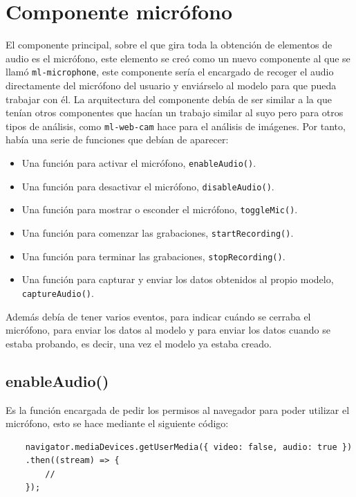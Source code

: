 \documentclass[a4paper, 12pt]{book}
\begin{document}
\section{Componente micrófono}
\label{sec:mic}

El componente principal, sobre el que gira toda la obtención de elementos de audio es el micrófono, este elemento se creó como un nuevo componente al que se llamó \texttt{ml-microphone}, este componente sería el encargado de recoger el audio directamente del micrófono del usuario y enviárselo al modelo para que pueda trabajar con él. La arquitectura del componente debía de ser similar a la que tenían otros componentes que hacían un trabajo similar al suyo pero para otros tipos de análisis, como \texttt{ml-web-cam} hace para el análisis de imágenes. Por tanto, había una serie de funciones que debían de aparecer:
\begin{itemize}
	\item Una función para activar el micrófono, \texttt{enableAudio()}.
	\item Una función para desactivar el micrófono, \texttt{disableAudio()}.
	\item Una función para mostrar o esconder el micrófono, \texttt{toggleMic()}.
	\item Una función para comenzar las grabaciones, \texttt{startRecording()}.
	\item Una función para terminar las grabaciones, \texttt{stopRecording()}.
	\item Una función para capturar y enviar los datos obtenidos al propio modelo, \texttt{captureAudio()}.
\end{itemize}

Además debía de tener varios eventos, para indicar cuándo se cerraba el micrófono, para enviar los datos al modelo y para enviar los datos cuando se estaba probando, es decir, una vez el modelo ya estaba creado.

\subsection*{enableAudio()}

Es la función encargada de pedir los permisos al navegador para poder utilizar el micrófono, esto se hace mediante el siguiente código:

{\footnotesize
\begin{verbatim}
	navigator.mediaDevices.getUserMedia({ video: false, audio: true })
	.then((stream) => {
		//
	});
\end{verbatim}
}
\end{document}
